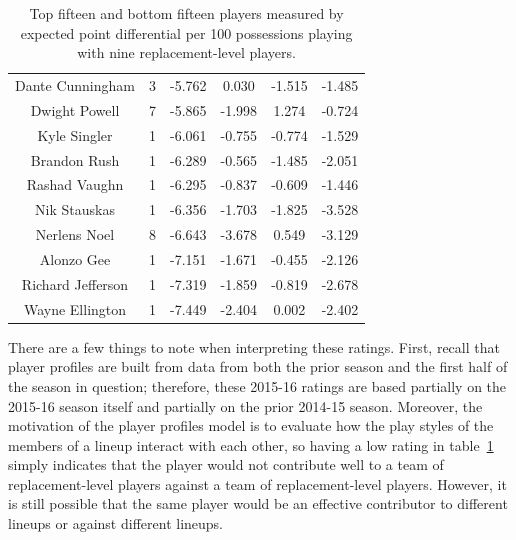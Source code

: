 \begin{table}
{\begin{tabular}{cccccc}
  Dante Cunningham &       3 &  -5.762 &  0.030 & -1.515 & -1.485 \\
     Dwight Powell &       7 &  -5.865 & -1.998 &  1.274 & -0.724 \\
      Kyle Singler &       1 &  -6.061 & -0.755 & -0.774 & -1.529 \\
      Brandon Rush &       1 &  -6.289 & -0.565 & -1.485 & -2.051 \\
     Rashad Vaughn &       1 &  -6.295 & -0.837 & -0.609 & -1.446 \\
      Nik Stauskas &       1 &  -6.356 & -1.703 & -1.825 & -3.528 \\
      Nerlens Noel &       8 &  -6.643 & -3.678 &  0.549 & -3.129 \\
        Alonzo Gee &       1 &  -7.151 & -1.671 & -0.455 & -2.126 \\
 Richard Jefferson &       1 &  -7.319 & -1.859 & -0.819 & -2.678 \\
   Wayne Ellington &       1 &  -7.449 & -2.404 &  0.002 & -2.402 \\
            \bottomrule
        \end{tabular}
    }
    \caption{Top fifteen and bottom fifteen players measured by expected point
    differential per 100 possessions playing with nine replacement-level players.}
    \label{tab:player_ratings}
\end{table}

There are a few things to note when interpreting these ratings. First, recall that
player profiles are built from data from both the prior season and the first half of
the season in question; therefore, these 2015-16 ratings are based partially on the
2015-16 season itself and partially on the prior 2014-15 season.  Moreover, the
motivation of the player profiles model is to evaluate how the play styles of the
members of a lineup interact with each other, so having a low rating in
table~\ref{tab:player_ratings} simply indicates that the player would not contribute
well to a team of replacement-level players against a team of replacement-level
players.  However, it is still possible that the same player would be an effective
contributor to different lineups or against different lineups.

